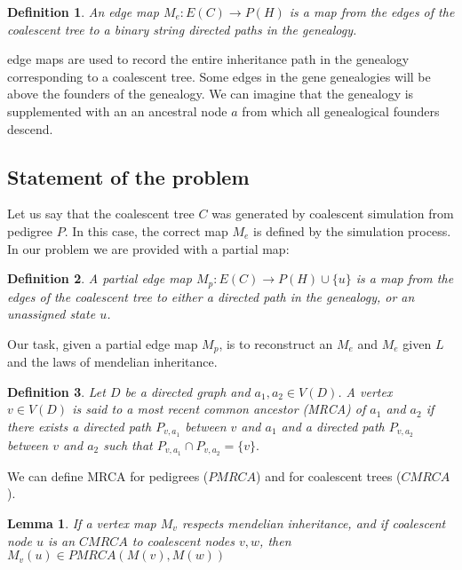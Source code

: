 \documentclass[14pt]{extarticle}
\newtheorem{definition}{Definition}
\newtheorem{lemma}{Lemma}
\begin{document}
\begin{definition}
An edge map $M_e:E(C) \rightarrow P(H)$ is a map from the edges of the coalescent tree to a binary string directed paths in the genealogy.    
\end{definition}

edge maps are used to record the entire inheritance path in the genealogy corresponding to a coalescent tree. Some edges in the gene genealogies will be above the founders of the genealogy. We can imagine that the genealogy is supplemented with an an ancestral node $a$ from which all genealogical founders descend.  



\subsection{Statement of the problem} 

Let us say that the coalescent tree $C$ was generated by coalescent simulation from pedigree $P$. In this case, the correct map $M_e$ is defined by the simulation process. 
In our problem we are provided with a partial map: 

\begin{definition}
A partial edge map $M_p:E(C) \rightarrow P(H) \cup \{u\}$ is a map from the edges of the coalescent tree to either a directed path in the genealogy, or an unassigned state $u$.    
\end{definition}



Our task, given a partial edge map $M_p$, is to reconstruct an $M_e$ and $M_e$ given $L$ and the laws of mendelian inheritance.  
\begin{definition}
	Let $D$ be a directed graph and $a_1, a_2 \in V(D)$. A vertex $v \in V(D)$ is said to a most recent common ancestor (MRCA) of $a_1$ and $a_2$ if there exists 
	a directed path $P_{v,a_1}$ between $v$ and $a_1$ and a directed path $P_{v,a_2}$ between $v$ and $a_2$ such that $P_{v,a_1} \cap P_{v,a_2} = \{v\}.$	
\end{definition}

We can define MRCA for pedigrees ($PMRCA$) and for coalescent trees ($CMRCA$).


\begin{lemma}
If a vertex map $M_v$ respects mendelian inheritance, and if coalescent node $u$ is an $CMRCA$ to coalescent nodes $v, w$, then $M_v(u) \in PMRCA(M(v),M(w))$   
\end{lemma}
\end{document}
